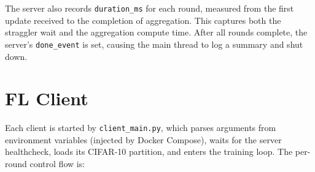 \documentclass[12pt,a4paper]{report}
\begin{document}
The server also records \texttt{duration\_ms} for each round, measured
from the first update received to the completion of aggregation.  This
captures both the straggler wait and the aggregation compute time.  After
all rounds complete, the server's \texttt{done\_event} is set, causing
the main thread to log a summary and shut down.

\section{FL Client}

Each client is started by \texttt{client\_main.py}, which parses
arguments from environment variables (injected by Docker Compose), waits
for the server healthcheck, loads its CIFAR-10 partition, and enters the
training loop.  The per-round control flow is:
\end{document}
